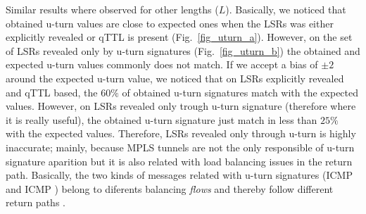 Similar results where observed for other lengths ($L$). Basically, we noticed
that  obtained u-turn values are close to expected ones when
the LSRs was either explicitly revealed or qTTL is present
(Fig.~\ref{fig_uturn_a}). However, on the set of LSRs revealed only by u-turn
signatures (Fig.~\ref{fig_uturn_b}) the obtained and expected u-turn values  
commonly does not match. If we accept a bias of $ \pm 2$ around the expected
u-turn value, we noticed that on LSRs explicitly revealed and qTTL based, 
the $60\%$ of obtained u-turn signatures match with the
expected values. However, on LSRs revealed only trough
u-turn signature (therefore where it is really useful), the obtained u-turn
signature just match in less than $25\%$  with the expected values.
Therefore, LSRs revealed only through u-turn is highly inaccurate; mainly,
because MPLS tunnels are not the only responsible of u-turn signature aparition but
it is also related with load balancing issues in the return path. Basically, 
the two kinds of messages related with u-turn signatures (ICMP \echoreply  and ICMP
\ttlexceeded) belong to diferents balancing \textit{flows} and thereby follow 
different return paths \cite{BRICE06}. 


